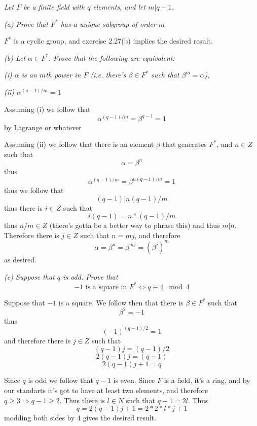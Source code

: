 \documentclass[11pt,oneside,titlepage]{book}
\DeclareMathOperator \lra {\Leftrightarrow}
\DeclareMathOperator \ra {\Rightarrow}
\begin{document}
\textit{Let $F$ be a finite field with $q$ elements, and let $m | q - 1$.}

\textit{(a) Prove that $F^*$ has a unique subgroup of order $m$.}

$F^*$ is a cyclic group, and exercise 2.27(b) implies the desired result.

\textit{(b) Let $\alpha \in F^*$. Prove that the following are equivalent:}

\textit{(i) $\alpha$ is an $m$th power in $F$ (i.e. there's $\beta \in F^*$
  such that $\beta^m = \alpha$).}

\textit{(ii) $\alpha^{(q - 1)/m} = 1$}

Assuming (i) we follow that
$$\alpha^{(q - 1)/m} = \beta^{q - 1} = 1$$
by Lagrange or whatever

Assuming (ii) we follow that there is an element $\beta$ that
generates $F^*$, and $n \in Z$ such that
$$\alpha = \beta^n$$
thus
$$\alpha^{(q - 1)/m} =  \beta^{n(q - 1)/m} = 1$$
thus we follow that
$$(q - 1) | n(q - 1)/m$$
thus there is $i \in Z$ such that
$$i(q - 1) = n * (q - 1) / m$$
thus $n / m \in Z$ (there's gotta be a better way to phrase this) and
thus $m | n$. Therefore there is $j \in Z$ such that $n = mj$, and
therefore
$$\alpha = \beta^n = \beta^{mj} = (\beta^{j})^m$$
as desired.

\textit{(c) Suppose that $q$ is odd. Prove that
  $$-1 \text{ is a square in } F^* \lra q \equiv 1 \mod 4$$}

Suppose that $-1$ is a square. We follow then that there is
$\beta \in F^*$ such that
$$\beta^2 = -1$$
thus
$$(-1)^{(q - 1)/2} = 1$$
and therefore there is $j \in Z$ such that
$$(q - 1)j = (q - 1)/2$$
$$2(q - 1)j = (q - 1)$$
$$2(q - 1)j + 1 = q$$

Since $q$ is odd we follow that $q - 1$ is even. Since $F$ is a field, it's a
ring, and by our standarts it's got to have at least two elements, and therefore
$q \geq 3 \ra q - 1 \geq 2$. Thus there is $l \in N$ such that $q - 1 = 2l$. Thus
$$q = 2(q - 1)j + 1 = 2 * 2 * l * j + 1$$
modding both sides by $4$ gives the desired result.
\end{document}

